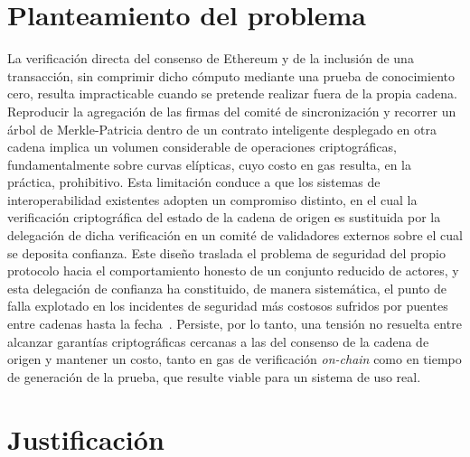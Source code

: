 \section{Planteamiento del problema}

La verificación directa del consenso de Ethereum y de la inclusión de una transacción, sin
comprimir dicho cómputo mediante una prueba de conocimiento cero, resulta impracticable cuando
se pretende realizar fuera de la propia cadena. Reproducir la agregación de las firmas del
comité de sincronización y recorrer un árbol de Merkle-Patricia dentro de un contrato
inteligente desplegado en otra cadena implica un volumen considerable de operaciones
criptográficas, fundamentalmente sobre curvas elípticas, cuyo costo en gas resulta, en la
práctica, prohibitivo. Esta limitación conduce a que los sistemas de interoperabilidad
existentes adopten un compromiso distinto, en el cual la verificación criptográfica del estado
de la cadena de origen es sustituida por la delegación de dicha verificación en un comité de
validadores externos sobre el cual se deposita confianza. Este diseño traslada el problema de
seguridad del propio protocolo hacia el comportamiento honesto de un conjunto reducido de
actores, y esta delegación de confianza ha constituido, de manera sistemática, el punto de
falla explotado en los incidentes de seguridad más costosos sufridos por puentes entre cadenas
hasta la fecha~\cite{zhang2023bridgesok}. Persiste, por lo tanto, una tensión no resuelta entre
alcanzar garantías criptográficas cercanas a las del consenso de la cadena de origen y mantener
un costo, tanto en gas de verificación \textit{on-chain} como en tiempo de generación de la
prueba, que resulte viable para un sistema de uso real.

\section{Justificación}

